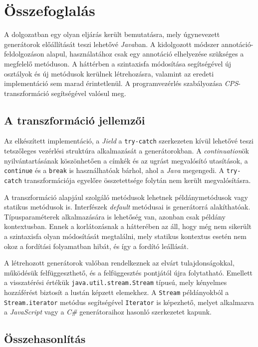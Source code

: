\chapter{Összefoglalás}

A dolgozatban egy olyan eljárás került bemutatásra, mely úgynevezett generátorok előállítását teszi lehetővé \textit{Java}ban. A kidolgozott módszer annotáció-feldolgozáson alapul, használatához csak egy annotáció elhelyezése szükséges a megfelelő metóduson. A háttérben a szintaxisfa módosítása segítségével új osztályok és új metódusok kerülnek létrehozásra, valamint az eredeti implementáció sem marad érintetlenül. A programvezérlés szabályozása \textit{CPS}-transzformáció segítségével valósul meg.

\section{A transzformáció jellemzői}

Az elkészített implementáció, a \textit{Jield} a \texttt{try-catch} szerkezeten kívül lehetővé teszi tetszőleges vezérlési struktúra alkalmazását a generátorokban. A \textit{continuation}ök nyilvántartásának köszönhetően a címkék és az ugrást megvalósító utasítások, a \texttt{continue} és a \texttt{break} is használhatóak bárhol, ahol a \textit{Java} megengedi. A \texttt{try-catch} transzformációja egyelőre összetettsége folytán nem került megvalósításra. 

A transzformáció alapjául szolgáló metódusok lehetnek példánymetódusok vagy statikus metódusok is. Interfészek \textit{default} metódusai is generátorrá alakíthatóak. Típusparaméterek alkalmazására is lehetőség van, azonban csak példány kontextusban. Ennek a korlátozásnak a hátterében az áll, hogy még nem sikerült a szintaxisfa olyan módosítását megtalálni, mely statikus kontextus esetén nem okoz a fordítási folyamatban hibát, és így a fordító leállását.

A létrehozott generátorok valóban rendelkeznek az elvárt tulajdonságokkal, működésük felfüggeszthető, és a felfüggesztés pontjától újra folytatható. Emellett a visszatérési értékük \texttt{java.util.stream.Stream} típusú, mely kényelmes hozzáférést biztosít a lustán képzett elemekhez. A \texttt{Stream} példányokból a \texttt{Stream.iterator} metódus segítségével \texttt{Iterator} is képezhető, melyet alkalmazva a \textit{JavaScript} vagy a \textit{C\#} generátoraihoz hasonló szerkezetet kapunk.

\section{Összehasonlítás}

